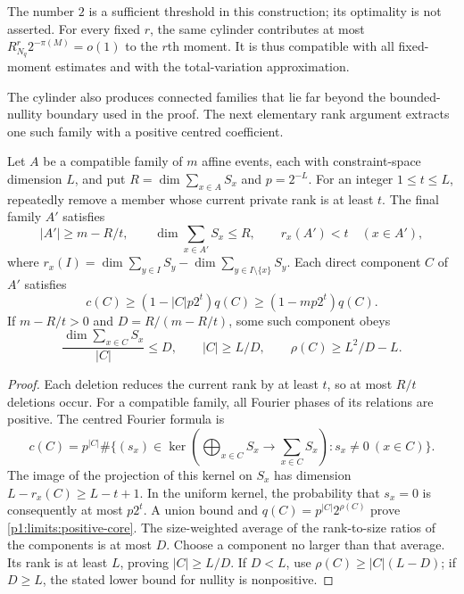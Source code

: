 The number $2$ is a sufficient threshold in this construction;
its optimality is not asserted.  For every fixed $r$, the same
cylinder contributes at most $R_{N_q}^r2^{-\pi(M)}=o(1)$ to
the $r$th moment.  It is thus compatible with all fixed-moment
estimates and with the total-variation approximation.

The cylinder also produces connected families that lie far beyond
the bounded-nullity boundary used in the proof.  The next elementary
rank argument extracts one such family with a positive centred
coefficient.

\begin{lemma}
\label{p1:limits:peeling}
Let $A$ be a compatible family of $m$ affine events, each with
constraint-space dimension $L$, and put
$R=\dim\sum_{x\in A}S_x$ and $p=2^{-L}$.
For an integer $1\le t\le L$, repeatedly remove a member whose
current private rank is at least $t$.  The final family $A'$ satisfies
\[
 |A'|\ge m-R/t,\qquad
 \dim\sum_{x\in A'}S_x\le R,\qquad
 r_x(A')<t\quad(x\in A'),
\]
where $r_x(I)=\dim\sum_{y\in I}S_y-
\dim\sum_{y\in I\setminus\{x\}}S_y$.
Each direct component $C$ of $A'$ satisfies
\begin{equation}
 c(C)\ge(1-|C|p2^t)q(C)\ge(1-mp2^t)q(C).
 \label{p1:limits:positive-core}
\end{equation}
If $m-R/t>0$ and $D=R/(m-R/t)$, some such component obeys
\begin{equation}
 \frac{\dim\sum_{x\in C}S_x}{|C|}\le D,\qquad
 |C|\ge L/D,\qquad \rho(C)\ge L^2/D-L.
 \label{p1:limits:rank-density}
\end{equation}
\end{lemma}
\begin{proof}
Each deletion reduces the current rank by at least $t$, so at
most $R/t$ deletions occur.  For a compatible family, all Fourier
phases of its relations are positive.  The centred Fourier formula is
\[
 c(C)=p^{|C|}\#\{(s_x)\in\ker(\bigoplus_{x\in C}S_x
                        \longrightarrow\sum_{x\in C}S_x):
                                      s_x\ne0\ (x\in C)\}.
\]
The image of the projection of this kernel on $S_x$ has dimension
$L-r_x(C)\ge L-t+1$.  In the uniform kernel, the probability
that $s_x=0$ is consequently at most $p2^t$.
A union bound and $q(C)=p^{|C|}2^{\rho(C)}$ prove
\eqref{p1:limits:positive-core}.  The size-weighted average of
the rank-to-size ratios of the components is at most $D$.
Choose a component no larger than that average.  Its rank is
at least $L$, proving $|C|\ge L/D$.  If $D<L$, use
$\rho(C)\ge|C|(L-D)$; if $D\ge L$, the stated lower bound
for nullity is nonpositive.
\end{proof}

